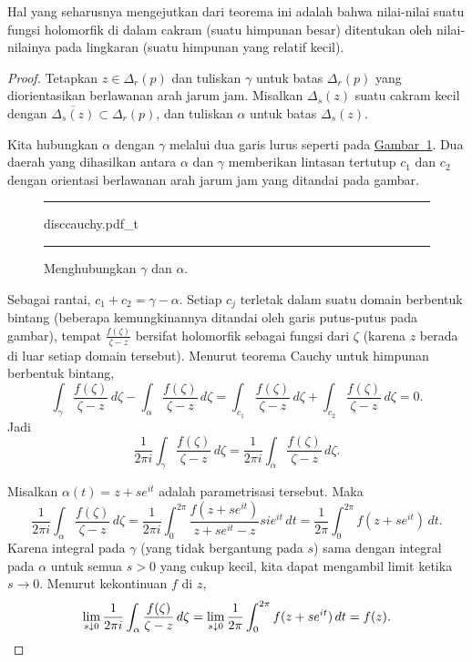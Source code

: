 \documentclass[12pt,openany]{book}
\theoremstyle{plain}
\theoremstyle{remark}
\theoremstyle{definition}
\newenvironment{myfig}{%
\begin{figure}[h!t]
\noindent\rule{\textwidth}{0.5pt}\vspace{12pt}\par\centering}%
{\par\noindent\rule{\textwidth}{0.5pt}
\end{figure}}
\theoremstyle{exercise}
\theoremstyle{example}
\newcommand{\figureref}[1]{\hyperref[#1]{Gambar~\ref*{#1}}}
\begin{document}
Hal yang seharusnya mengejutkan dari teorema ini adalah bahwa nilai-nilai suatu
fungsi holomorfik di dalam cakram (suatu himpunan besar) ditentukan oleh
nilai-nilainya pada lingkaran (suatu himpunan yang relatif kecil).

\begin{proof}
Tetapkan $z \in \Delta_r(p)$ dan tuliskan
$\gamma$ untuk batas $\Delta_r(p)$ yang diorientasikan berlawanan arah jarum jam.
Misalkan $\Delta_s(z)$ suatu cakram kecil dengan $\overline{\Delta_s(z)} \subset
\Delta_r(p)$, dan tuliskan $\alpha$ untuk batas $\Delta_s(z)$.

Kita hubungkan $\alpha$ dengan $\gamma$
melalui dua garis lurus seperti pada \figureref{fig:disccauchy}.
Dua daerah yang dihasilkan antara $\alpha$ dan $\gamma$
memberikan lintasan tertutup $c_1$ dan $c_2$ dengan orientasi berlawanan arah
jarum jam yang ditandai pada gambar.
\begin{myfig}
{disccauchy.pdf_t}
\caption{Menghubungkan $\gamma$ dan $\alpha$.%
\label{fig:disccauchy}}
\end{myfig}

Sebagai rantai, $c_1+c_2 = \gamma - \alpha$.  Setiap
$c_j$ terletak dalam suatu domain berbentuk bintang (beberapa kemungkinannya ditandai oleh garis putus-putus pada gambar),
tempat $\frac{f(\zeta)}{\zeta-z}$ bersifat holomorfik
sebagai fungsi dari $\zeta$ (karena $z$ berada di luar setiap domain tersebut).
Menurut teorema Cauchy untuk himpunan berbentuk bintang,
\begin{equation*}
\int_{\gamma} \frac{f(\zeta)}{\zeta-z} \, d\zeta -
\int_{\alpha} \frac{f(\zeta)}{\zeta-z} \, d\zeta =
\int_{c_1} \frac{f(\zeta)}{\zeta-z} \, d\zeta + 
\int_{c_2} \frac{f(\zeta)}{\zeta-z} \, d\zeta = 0 .
\end{equation*}
Jadi
\begin{equation*}
\frac{1}{2\pi i}
\int_{\gamma} \frac{f(\zeta)}{\zeta-z} \, d\zeta =
\frac{1}{2\pi i}
\int_{\alpha} \frac{f(\zeta)}{\zeta-z} \, d\zeta .
\end{equation*}

Misalkan $\alpha(t) = z+s e^{i t}$ adalah parametrisasi tersebut.
Maka
\begin{equation*}
\frac{1}{2\pi i}
\int_{\alpha}
\frac{f(\zeta)}{\zeta-z}
\,
d \zeta
=
\frac{1}{2\pi i}
\int_0^{2\pi} \frac{f(z+se^{it})}{z + se^{it} - z} s i e^{it} \, dt
=
\frac{1}{2\pi}
\int_0^{2\pi} f(z+se^{it}) \, dt .
\end{equation*}
Karena integral pada $\gamma$ (yang tidak bergantung pada $s$)
sama dengan integral pada $\alpha$ untuk semua $s > 0$ yang cukup kecil,
kita dapat mengambil limit ketika $s \to 0$.
Menurut kekontinuan $f$ di $z$,
\begin{equation*}
\lim_{s \downarrow 0}
\frac{1}{2\pi i}
\int_{\alpha}
\frac{f(\zeta)}{\zeta-z}
\,
d \zeta
=
\lim_{s \downarrow 0}
\frac{1}{2\pi}
\int_0^{2\pi} f(z+se^{it}) \, dt
=
f(z) . \qedhere
\end{equation*}
\end{proof}
\end{document}
